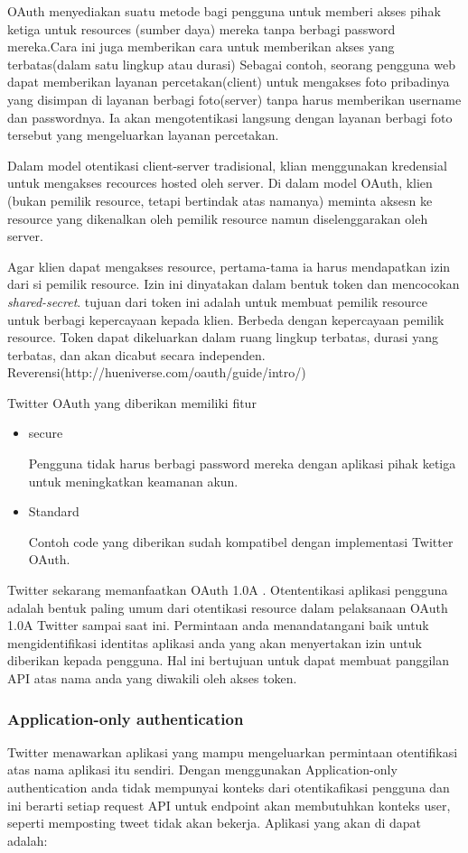 OAuth menyediakan suatu metode bagi pengguna untuk memberi akses pihak ketiga untuk resources (sumber daya) mereka tanpa berbagi password mereka.Cara ini juga memberikan cara untuk memberikan akses yang terbatas(dalam satu lingkup atau durasi) Sebagai contoh, seorang pengguna web dapat memberikan layanan percetakan(client) untuk mengakses foto pribadinya yang disimpan di layanan berbagi foto(server) tanpa harus memberikan username dan passwordnya. Ia akan mengotentikasi langsung dengan layanan berbagi foto tersebut yang mengeluarkan layanan percetakan.

Dalam model otentikasi client-server tradisional, klian menggunakan kredensial untuk mengakses recources hosted oleh server. Di dalam model OAuth, klien (bukan pemilik resource, tetapi bertindak atas namanya) meminta aksesn ke resource yang dikenalkan oleh pemilik resource namun diselenggarakan oleh server.

Agar klien dapat mengakses resource, pertama-tama ia harus mendapatkan izin dari si pemilik resource. Izin ini dinyatakan dalam bentuk token dan mencocokan \textit{shared-secret}. tujuan dari token ini adalah untuk membuat pemilik resource untuk berbagi kepercayaan kepada klien. Berbeda dengan kepercayaan pemilik resource. Token dapat dikeluarkan dalam ruang lingkup terbatas, durasi yang terbatas, dan akan dicabut secara independen. Reverensi(http://hueniverse.com/oauth/guide/intro/)

Twitter OAuth yang diberikan memiliki fitur
\begin{itemize}
	\item secure
	
	Pengguna tidak harus berbagi password mereka dengan aplikasi pihak ketiga untuk meningkatkan keamanan akun.
	\item Standard
	
	Contoh code yang diberikan sudah kompatibel dengan implementasi Twitter OAuth.
\end{itemize}

Twitter sekarang memanfaatkan OAuth 1.0A . Otententikasi aplikasi pengguna adalah bentuk paling umum dari otentikasi resource dalam pelaksanaan OAuth 1.0A Twitter sampai saat ini. Permintaan anda menandatangani baik untuk mengidentifikasi identitas aplikasi anda yang akan menyertakan izin untuk diberikan kepada pengguna. Hal ini bertujuan untuk dapat membuat panggilan API atas nama anda yang diwakili oleh akses token.

\subsubsection{Application-only authentication}
Twitter menawarkan aplikasi yang mampu mengeluarkan permintaan otentifikasi atas nama aplikasi itu sendiri. Dengan menggunakan Application-only authentication  anda tidak mempunyai konteks dari otentikafikasi pengguna dan ini berarti setiap request API untuk endpoint akan membutuhkan konteks user, seperti memposting tweet tidak akan bekerja. Aplikasi yang akan di dapat adalah: 

